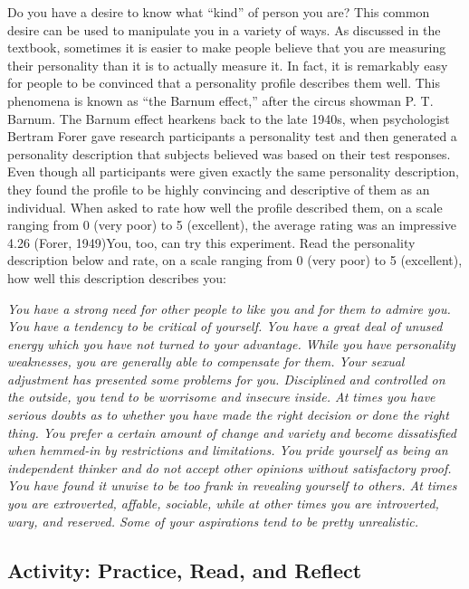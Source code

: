 \documentclass[
]{book}
\begin{document}
Do you have a desire to know what ``kind'' of person you are? This common desire can be used to manipulate you in a variety of ways. As discussed in the textbook, sometimes it is easier to make people believe that you are measuring their personality than it is to actually measure it. In fact, it is remarkably easy for people to be convinced that a personality profile describes them well. This phenomena is known as ``the Barnum effect,'' after the circus showman P. T. Barnum. The Barnum effect hearkens back to the late 1940s, when psychologist Bertram Forer gave research participants a personality test and then generated a personality description that subjects believed was based on their test responses. Even though all participants were given exactly the same personality description, they found the profile to be highly convincing and descriptive of them as an individual. When asked to rate how well the profile described them, on a scale ranging from 0 (very poor) to 5 (excellent), the average rating was an impressive 4.26 (Forer, 1949)You, too, can try this experiment. Read the personality description below and rate, on a scale ranging from 0 (very poor) to 5 (excellent), how well this description describes you:

\emph{You have a strong need for other people to like you and for them to ad­mire you. You have a tendency to be critical of yourself. You have a great deal of unused energy which you have not turned to your advantage. While you have personality weaknesses, you are generally able to compensate for them. Your sexual adjustment has presented some problems for you. Dis­ci­plined and controlled on the outside, you tend to be worrisome and in­se­cure inside. At times you have serious doubts as to whether you have made the right decision or done the right thing. You prefer a certain amount of change and variety and become dissatisfied when hemmed-in by restrictions and limitations. You pride yourself as being an independent thinker and do not accept other opinions without satisfactory proof. You have found it un­wise to be too frank in revealing yourself to others. At times you are extro­verted, affable, sociable, while at other times you are introverted, wary, and reserved. Some of your aspirations tend to be pretty unrealistic.}

\hypertarget{activity-practice-read-and-reflect}{%
\subsection*{Activity: Practice, Read, and Reflect}\label{activity-practice-read-and-reflect}}
\end{document}
